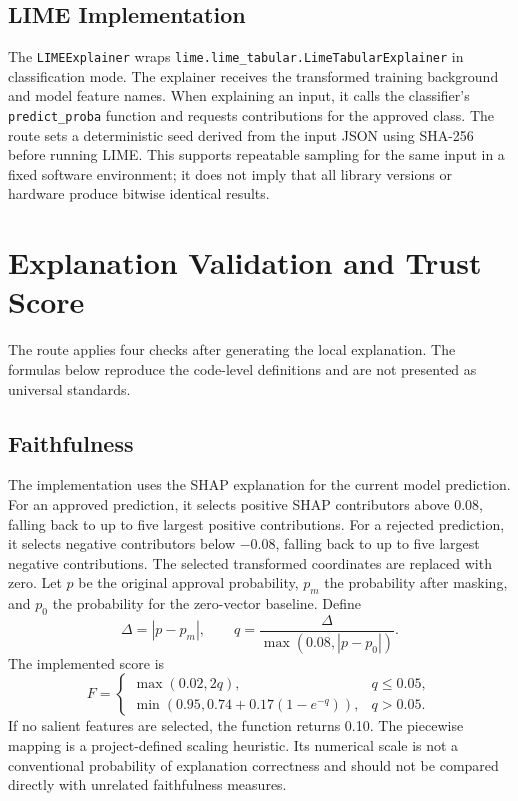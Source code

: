 \subsection{LIME Implementation}
The \texttt{LIMEExplainer} wraps \texttt{lime.lime\_tabular.LimeTabularExplainer} in classification mode. The explainer receives the transformed training background and model feature names. When explaining an input, it calls the classifier's \texttt{predict\_proba} function and requests contributions for the approved class. The route sets a deterministic seed derived from the input JSON using SHA-256 before running LIME. This supports repeatable sampling for the same input in a fixed software environment; it does not imply that all library versions or hardware produce bitwise identical results.

\section{Explanation Validation and Trust Score}
The route applies four checks after generating the local explanation. The formulas below reproduce the code-level definitions and are not presented as universal standards.

\subsection{Faithfulness}
The implementation uses the SHAP explanation for the current model prediction. For an approved prediction, it selects positive SHAP contributors above 0.08, falling back to up to five largest positive contributions. For a rejected prediction, it selects negative contributors below $-0.08$, falling back to up to five largest negative contributions. The selected transformed coordinates are replaced with zero. Let $p$ be the original approval probability, $p_m$ the probability after masking, and $p_0$ the probability for the zero-vector baseline. Define
\begin{equation}
  \Delta=|p-p_m|,\qquad q=\frac{\Delta}{\max(0.08,|p-p_0|)}.
\end{equation}
The implemented score is
\begin{equation}
 F=\begin{cases}
 \max(0.02,2q), & q\leq 0.05,\\
 \min(0.95,0.74+0.17(1-e^{-q})), & q>0.05.
 \end{cases}
 \label{eq:faithfulness}
\end{equation}
If no salient features are selected, the function returns 0.10. The piecewise mapping is a project-defined scaling heuristic. Its numerical scale is not a conventional probability of explanation correctness and should not be compared directly with unrelated faithfulness measures.


